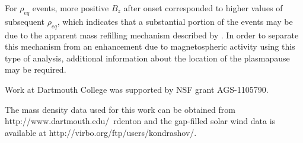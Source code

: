 \documentclass[draft,linenumbers]{agujournal}
\begin{document}
For $\rho_{eq}$ events, more positive $B_{z}$ after onset corresponded to higher values of subsequent $\rho_{eq}$, which indicates that a substantial portion of the events may be due to the apparent mass refilling mechanism described by \citet{Denton2016}.  In order to separate this mechanism from an enhancement due to magnetospheric activity using this type of analysis, additional information about the location of the plasmapause may be required.

\acknowledgments
Work at Dartmouth College was supported by NSF grant AGS-1105790. 

The mass density data used for this work can be obtained from http://www.dartmouth.edu/~rdenton and the gap-filled solar wind data is available at http://virbo.org/ftp/users/kondrashov/.










%
%
%
%
%
%
%
%
%
%
\end{document}
